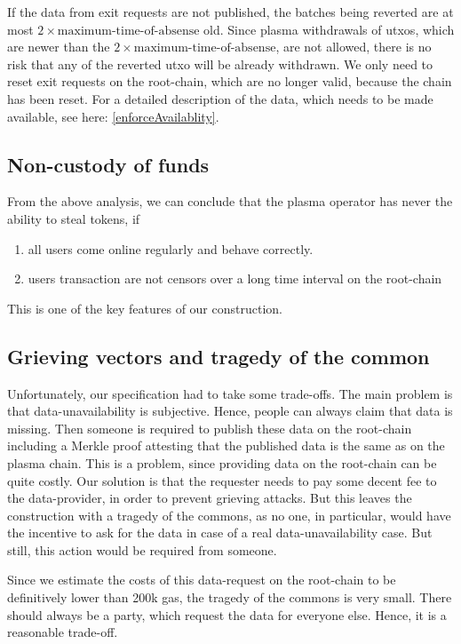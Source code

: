 \documentclass[11pt,parskip=full]{scrartcl}%
\begin{document}
If the data from exit requests are not published, the batches being reverted are at most $2 \times \text{maximum-time-of-absense}$ old. 
Since plasma withdrawals of utxos, which are newer than the $2 \times \text{maximum-time-of-absense}$, are not allowed, there is no risk that any of the reverted utxo will be already withdrawn.
We only need to reset exit requests on the root-chain, which are no longer valid, because the chain has been reset. 
For a detailed description of the data, which needs to be made available, see here: \ref{enforceAvailablity}. 


\subsection{Non-custody of funds}
From the above analysis, we can conclude that the plasma operator has never the ability to steal tokens, if
\begin{enumerate}
\item all users come online regularly and behave correctly. 
\item users transaction are not censors over a long time interval on the root-chain
\end{enumerate}
This is one of the key features of our construction. 

\subsection{Grieving vectors and tragedy of the common}
Unfortunately, our specification had to take some trade-offs. 
The main problem is that data-unavailability is subjective. 
Hence, people can always claim that data is missing. 
Then someone is required to publish these data on the root-chain including a Merkle proof attesting that the published data is the same as on the plasma chain. 
This is a problem, since providing data on the root-chain can be quite costly. 
Our solution is that the requester needs to pay some decent fee to the data-provider, in order to prevent grieving attacks. 
But this leaves the construction with a tragedy of the commons, as no one, in particular, would have the incentive to ask for the data in case of a real data-unavailability case. 
But still, this action would be required from someone. 

Since we estimate the costs of this data-request on the root-chain to be definitively lower than 200k gas, the tragedy of the commons is very small. 
There should always be a party, which request the data for everyone else. Hence, it is a reasonable trade-off. 
\end{document}

